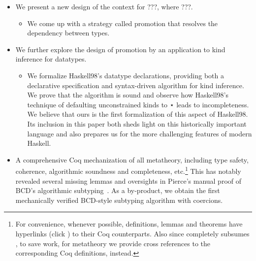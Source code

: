 \begin{itemize}
\item We present a new design of the context for ???, where ???.
  \begin{itemize}
  \item We come up with a strategy called promotion that resolves the dependency between types.
  \end{itemize}

\item We further explore the design of promotion by an application to kind
  inference for datatypes.
  \begin{itemize}
  \item We formalize Haskell98’s datatype declarations, providing both a
    declarative specification and syntax-driven algorithm for kind inference. We
    prove that the algorithm is sound and observe how Haskell98’s technique of
    defaulting unconstrained kinds to ⋆ leads to incompleteness. We believe that
    ours is the first formalization of this aspect of Haskell98. Its inclusion
    in this paper both sheds light on this historically important language and
    also prepares us for the more challenging features of modern Haskell.
  \end{itemize}
  


\item A comprehensive Coq mechanization of all metatheory, including type
  safety, coherence, algorithmic soundness and completeness, etc.\footnote{For
    convenience, whenever possible, definitions, lemmas and theorems have hyperlinks (click
    \href{https://github.com/bixuanzju/phd-thesis-artifact}{\leftpointright}) to their Coq counterparts. Also since \fnamee completely
    subsumes \namee, to save work, for \namee metatheory we provide cross
    references to the corresponding \fnamee Coq definitions, instead.} This has
  notably revealed several missing lemmas and oversights in Pierce's manual
  proof of BCD's algorithmic subtyping~\citep{pierce1989decision}. As a
  by-product, we obtain the first mechanically verified BCD-style subtyping
  algorithm with coercions.


\end{itemize}




